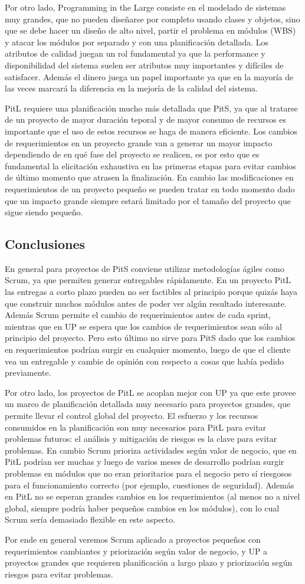 Por otro lado, Programming in the Large consiste en el modelado de sistemas muy grandes, que no pueden diseñarse por completo usando clases y objetos, sino que se debe hacer un diseño de alto nivel, partir el problema en módulos (WBS) y atacar los módulos por separado y con una planificación detallada. Los atributos de calidad juegan un rol fundamental ya que la performance y disponibilidad del sistema suelen ser atributos muy importantes y difíciles de satisfacer. Además el dinero juega un papel importante ya que en la mayoría de las veces marcará la diferencia en la mejoría de la calidad del sistema.

PitL requiere una planificación mucho más detallada que PitS, ya que al tratarse de un proyecto de mayor duración teporal y de mayor consumo de recursos es importante que el uso de estos recursos se haga de manera eficiente. Los cambios de requerimientos en un proyecto grande van a generar un mayor impacto dependiendo de en qué fase del proyecto se realicen, es por esto que es fundamental la elicitación exhaustiva en las primeras etapas para evitar cambios de último momento que atrasen la finalización. En cambio las modificaciones en requerimientos de un proyecto pequeño se pueden tratar en todo momento dado que un impacto grande siempre estará limitado por el tamaño del proyecto que sigue siendo pequeño.

\subsection{Conclusiones}
En general para proyectos de PitS conviene utilizar metodologías ágiles como Scrum, ya que permiten generar entregables rápidamente. En un proyecto PitL las entregas a corto plazo pueden no ser factibles al principio porque quizás haya que construir muchos módulos antes de poder ver algún resultado interesante. Además Scrum permite el cambio de requerimientos antes de cada sprint, mientras que en UP se espera que los cambios de requerimientos sean sólo al principio del proyecto. Pero esto último no sirve para PitS dado que los cambios en requerimientos podrían surgir en cualquier momento, luego de que el cliente vea un entregable y cambie de opinión con respecto a cosas que había pedido previamente.

Por otro lado, los proyectos de PitL se acoplan mejor con UP ya que este provee un marco de planificación detallada muy necesario para proyectos grandes, que permite llevar el control global del proyecto. El esfuerzo y los recursos consumidos en la planificación son muy necesarios para PitL para evitar problemas futuros: el análisis y mitigación de riesgos es la clave para evitar problemas. En cambio Scrum prioriza actividades según valor de negocio, que en PitL podrían ser muchas y luego de varios meses de desarrollo podrían surgir problemas en módulos que no eran prioritarios para el negocio pero sí riesgosos para el funcionamiento correcto (por ejemplo, cuestiones de seguridad). Además en PitL no se esperan grandes cambios en los requerimientos (al menos no a nivel global, siempre podría haber pequeños cambios en los módulos), con lo cual Scrum sería demasiado flexible en este aspecto.

Por ende en general veremos Scrum aplicado a proyectos pequeños con requerimientos cambiantes y priorización según valor de negocio, y UP a proyectos grandes que requieren planificación a largo plazo y priorización según riesgos para evitar problemas.
